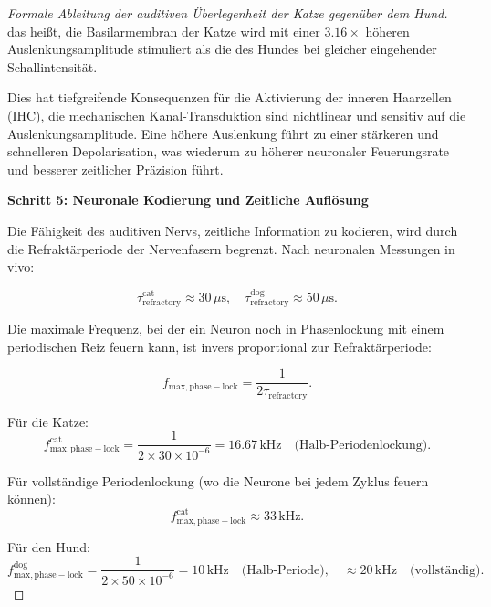 ﻿\documentclass[12pt, a4paper]{article}
\theoremstyle{definition}
\theoremstyle{remark}
\begin{document}
\begin{proof}[Formale Ableitung der auditiven Überlegenheit der Katze gegenüber dem Hund]
das heißt, die Basilarmembran der Katze wird mit einer $3.16\times$ höheren Auslenkungsamplitude stimuliert als die des Hundes bei gleicher eingehender Schallintensität.

Dies hat tiefgreifende Konsequenzen für die Aktivierung der inneren Haarzellen (IHC), die mechanischen Kanal-Transduktion sind nichtlinear und sensitiv auf die Auslenkungsamplitude. Eine höhere Auslenkung führt zu einer stärkeren und schnelleren Depolarisation, was wiederum zu höherer neuronaler Feuerungsrate und besserer zeitlicher Präzision führt.

\textbf{Schritt 5: Neuronale Kodierung und Zeitliche Auflösung}

Die Fähigkeit des auditiven Nervs, zeitliche Information zu kodieren, wird durch die Refraktärperiode der Nervenfasern begrenzt. Nach neuronalen Messungen in vivo:

\begin{equation}
\tau_{\mathrm{refractory}}^{\mathrm{cat}} \approx 30\,\mu\mathrm{s}, \quad \tau_{\mathrm{refractory}}^{\mathrm{dog}} \approx 50\,\mu\mathrm{s}.
\label{eq:refractory_values}
\end{equation}

Die maximale Frequenz, bei der ein Neuron noch in Phasenlockung mit einem periodischen Reiz feuern kann, ist invers proportional zur Refraktärperiode:

\begin{equation}
f_{\mathrm{max, phase-lock}} = \frac{1}{2\tau_{\mathrm{refractory}}}.
\label{eq:phase_lock_max_freq}
\end{equation}

Für die Katze:
\begin{equation}
f_{\mathrm{max, phase-lock}}^{\mathrm{cat}} = \frac{1}{2 \times 30 \times 10^{-6}} = 16.67\,\mathrm{kHz} \quad \text{(Halb-Periodenlockung)}.
\label{eq:phase_lock_cat_half}
\end{equation}

Für vollständige Periodenlockung (wo die Neurone bei jedem Zyklus feuern können):
\begin{equation}
f_{\mathrm{max, phase-lock}}^{\mathrm{cat}} \approx 33\,\mathrm{kHz}.
\label{eq:phase_lock_cat_full}
\end{equation}

Für den Hund:
\begin{equation}
f_{\mathrm{max, phase-lock}}^{\mathrm{dog}} = \frac{1}{2 \times 50 \times 10^{-6}} = 10\,\mathrm{kHz} \quad \text{(Halb-Periode)}, \quad \approx 20\,\mathrm{kHz} \quad \text{(vollständig)}.
\label{eq:phase_lock_dog_full}
\end{equation}


\end{proof}
\end{document}
